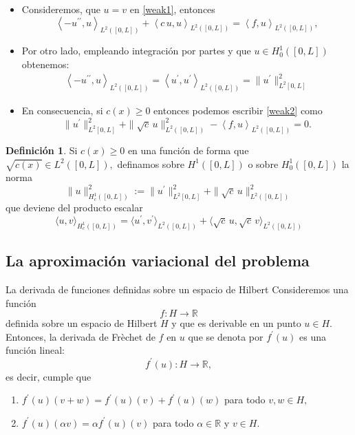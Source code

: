 \documentclass[10pt,handout]{beamer}
\theoremstyle{plain} %
\theoremstyle{plain} %
\theoremstyle{plain} %
\theoremstyle{plain} %
\theoremstyle{definition}
\newtheorem{defn}{Definici\'on}
\theoremstyle{example}
\theoremstyle{example}
\theoremstyle{remark}
\theoremstyle{remark}
\begin{document}
\begin{frame}
\begin{itemize}
\item Consideremos, que $u=v$ en \eqref{weak1}, entonces
\begin{equation}
\left\langle  - u^{\prime \prime} , u \right\rangle_{L^2([0,L])}  + \left\langle  c\,u, u \right\rangle_{L^2([0,L])}=  \left\langle f, u \right\rangle_{L^2([0,L])}, \label{weak2}
\end{equation}
\item Por otro lado, empleando integración por partes y que $u \in H_0^1([0,L])$ obtenemos:
\begin{align*}
\left\langle  - u^{\prime \prime} , u \right\rangle_{L^2([0,L])} = \left\langle  u^{\prime} ,  u^{\prime} \right\rangle_{L^2([0,L])} = \|u^{\prime}\|_{L^2[0,L]}^2
\end{align*}
\item En consecuencia, si $c(x) \ge 0$ entonces podemos escribir \eqref{weak2} como
\begin{equation}
\|u^{\prime}\|_{L^2[0,L]}^2 + \|\sqrt{c}\,u\|_{L^2([0,L])}^2 - \left\langle f, u \right\rangle_{L^2([0,L])} =0. \label{weak3}
\end{equation}
\end{itemize}
\end{frame}

\begin{frame}
\begin{defn}
Si $c(x) \ge 0$ en una función de forma que $\sqrt{c(x)} \in L^2([0,L]),$ definamos sobre $H^1([0,L])$ o sobre $H^1_0([0,L])$ la norma
$$
\|u\|_{H^1_c([0,L])}^2 := \|u^{\prime}\|_{L^2[0,L]}^2 + \|\sqrt{c}\,u\|_{L^2([0,L])}^2
$$ 
que deviene del producto escalar
$$
\langle u,v \rangle_{H^1_c([0,L])} = \langle u^{\prime},v^{\prime} \rangle_{L^2([0,L])}
+ \langle  \sqrt{c}\,u,\sqrt{c}\,v \rangle_{L^2([0,L])}
$$
\end{defn}
\end{frame}

\subsection{La aproximación variacional del problema}

\begin{frame}{La derivada de funciones definidas sobre un espacio de Hilbert}
Consideremos una función $$f:H \longrightarrow \mathbb{R}$$ definida sobre un espacio de Hilbert $H$ y que es derivable en un punto $u \in H.$ Entonces, la derivada de Frèchet de $f$ en $u$ que se denota por $f^{\prime}(u)$  es una función lineal:
$$
f^{\prime}(u):H \longrightarrow \mathbb{R},
$$
es decir, cumple que
\begin{enumerate}
    \item $f^{\prime}(u)(v+w) = f^{\prime}(u)(v) + f^{\prime}(u)(w)$ para todo $v,w \in H,$
    \item $f^{\prime}(u)(\alpha v) = \alpha f^{\prime}(u)(v)$ para todo $\alpha \in \mathbb{R}$ y $v \in H.$
\end{enumerate}
\end{frame}
\end{document}
